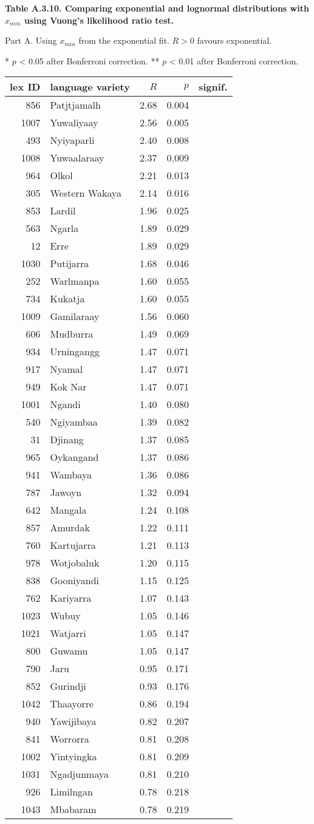\newpage

\textbf{Table A.3.10. Comparing exponential and lognormal distributions
with \(x_{min}\) using Vuong's likelihood ratio test.}

Part A. Using \(x_{min}\) from the exponential fit. \(R > 0\) favours
exponential.

* \(p\) \textless{} 0.05 after Bonferroni correction. ** \(p\)
\textless{} 0.01 after Bonferroni correction.

\begin{longtable}[]{@{}rlrrl@{}}
\toprule
\textbf{lex ID} & \textbf{language variety} & \(R\) & \(p\) &
\textbf{signif.}\tabularnewline
\midrule
\endhead
856 & Patjtjamalh & 2.68 & 0.004 &\tabularnewline
1007 & Yuwaliyaay & 2.56 & 0.005 &\tabularnewline
493 & Nyiyaparli & 2.40 & 0.008 &\tabularnewline
1008 & Yuwaalaraay & 2.37 & 0.009 &\tabularnewline
964 & Olkol & 2.21 & 0.013 &\tabularnewline
305 & Western Wakaya & 2.14 & 0.016 &\tabularnewline
853 & Lardil & 1.96 & 0.025 &\tabularnewline
563 & Ngarla & 1.89 & 0.029 &\tabularnewline
12 & Erre & 1.89 & 0.029 &\tabularnewline
1030 & Putijarra & 1.68 & 0.046 &\tabularnewline
252 & Warlmanpa & 1.60 & 0.055 &\tabularnewline
734 & Kukatja & 1.60 & 0.055 &\tabularnewline
1009 & Gamilaraay & 1.56 & 0.060 &\tabularnewline
606 & Mudburra & 1.49 & 0.069 &\tabularnewline
934 & Urningangg & 1.47 & 0.071 &\tabularnewline
917 & Nyamal & 1.47 & 0.071 &\tabularnewline
949 & Kok Nar & 1.47 & 0.071 &\tabularnewline
1001 & Ngandi & 1.40 & 0.080 &\tabularnewline
540 & Ngiyambaa & 1.39 & 0.082 &\tabularnewline
31 & Djinang & 1.37 & 0.085 &\tabularnewline
965 & Oykangand & 1.37 & 0.086 &\tabularnewline
941 & Wambaya & 1.36 & 0.086 &\tabularnewline
787 & Jawoyn & 1.32 & 0.094 &\tabularnewline
642 & Mangala & 1.24 & 0.108 &\tabularnewline
857 & Amurdak & 1.22 & 0.111 &\tabularnewline
760 & Kartujarra & 1.21 & 0.113 &\tabularnewline
978 & Wotjobaluk & 1.20 & 0.115 &\tabularnewline
838 & Gooniyandi & 1.15 & 0.125 &\tabularnewline
762 & Kariyarra & 1.07 & 0.143 &\tabularnewline
1023 & Wubuy & 1.05 & 0.146 &\tabularnewline
1021 & Watjarri & 1.05 & 0.147 &\tabularnewline
800 & Guwamu & 1.05 & 0.147 &\tabularnewline
790 & Jaru & 0.95 & 0.171 &\tabularnewline
852 & Gurindji & 0.93 & 0.176 &\tabularnewline
1042 & Thaayorre & 0.86 & 0.194 &\tabularnewline
940 & Yawijibaya & 0.82 & 0.207 &\tabularnewline
841 & Worrorra & 0.81 & 0.208 &\tabularnewline
1002 & Yintyingka & 0.81 & 0.209 &\tabularnewline
1031 & Ngadjunmaya & 0.81 & 0.210 &\tabularnewline
926 & Limilngan & 0.78 & 0.218 &\tabularnewline
1043 & Mbabaram & 0.78 & 0.219 &\tabularnewline

\end{longtable}
